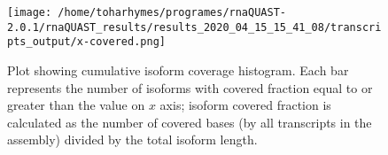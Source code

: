 \documentclass[12pt,a4paper]{article}
\begin{document}
\begin{figure}[t]\centering\texttt{[image: /home/toharhymes/programes/rnaQUAST-2.0.1/rnaQUAST\_results/results\_2020\_04\_15\_15\_41\_08/transcripts\_output/x-covered.png]}\caption{Plot showing cumulative isoform coverage histogram. Each bar represents the number of isoforms with covered fraction equal to or greater than the value on $x$ axis; isoform covered fraction is calculated as the number of covered bases (by all transcripts in the assembly) divided by the total isoform length.}\end{figure}\FloatBarrier\clearpage
\end{document}

